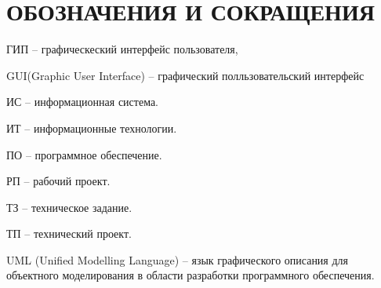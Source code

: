 \section*{ОБОЗНАЧЕНИЯ И СОКРАЩЕНИЯ}

ГИП -- графическеский интерфейс пользователя,

GUI(Graphic User Interface) -- графический полльзовательский интерфейс

ИС -- информационная система.

ИТ -- информационные технологии. 

ПО -- программное обеспечение.

РП -- рабочий проект.

ТЗ -- техническое задание.

ТП -- технический проект.

UML (Unified Modelling Language) -- язык графического описания для объектного моделирования в области разработки программного обеспечения.
